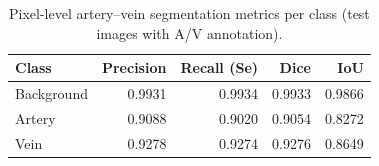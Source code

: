 \begin{table}
\caption{Pixel-level artery–vein segmentation metrics per class (test images with A/V annotation).}
\label{tab:av_per_class}
\begin{tabular}{lrrrr}
\toprule
Class & Precision & Recall (Se) & Dice & IoU \\
\midrule
Background & 0.9931 & 0.9934 & 0.9933 & 0.9866 \\
Artery & 0.9088 & 0.9020 & 0.9054 & 0.8272 \\
Vein & 0.9278 & 0.9274 & 0.9276 & 0.8649 \\
\bottomrule
\end{tabular}
\end{table}
